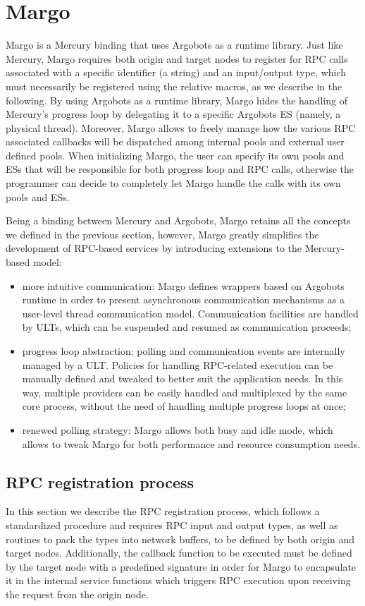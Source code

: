 \chapter{Margo}
\label{sec:margo}
Margo \cite{mochi-core} is a Mercury binding that uses Argobots as a runtime library. Just like Mercury, Margo requires both origin and target nodes to register for RPC calls associated with a specific identifier (a string) and an input/output type, which must necessarily be registered using the relative macros, as we describe in the following.\newline
By using Argobots as a runtime library, Margo hides the handling of Mercury's progress loop by delegating it to a specific Argobots ES (namely, a physical thread). Moreover, Margo allows to freely manage how the various RPC associated callbacks will be dispatched among internal pools and external user defined pools. When initializing Margo, the user can specify its own pools and ESs that will be responsible for both progress loop and RPC calls, otherwise the programmer can decide to completely let Margo handle the calls with its own pools and ESs.\newline

Being a binding between Mercury and Argobots, Margo retains all the concepts we defined in the previous section, however, Margo greatly simplifies the development of RPC-based services by introducing extensions to the Mercury-based model:
\begin{itemize}
    \item more intuitive communication: Margo defines wrappers based on Argobots runtime in order to present asynchronous communication mechanisms as a user-level thread communication model. Communication facilities are handled by ULTs, which can be suspended and resumed as communication proceeds;
    \item progress loop abstraction: polling and communication events are internally managed by a ULT. Policies for handling RPC-related execution can be manually defined and tweaked to better suit the application needs. In this way, multiple providers can be easily handled and multiplexed by the same core process, without the need of handling multiple progress loops at once;
    \item renewed polling strategy: Margo allows both busy and idle mode, which allows to tweak Margo for both performance and resource consumption needs.
\end{itemize}
\section{RPC registration process}
\label{sec:rpc-reg}
In this section we describe the RPC registration process, which follows a standardized procedure and requires RPC input and output types, as well as routines to pack the types into network buffers, to be defined by both origin and target nodes. Additionally, the callback function to be executed must be defined by the target node with a predefined signature in order for Margo to encapsulate it in the internal service functions which triggers RPC execution upon receiving the request from the origin node.\newline

